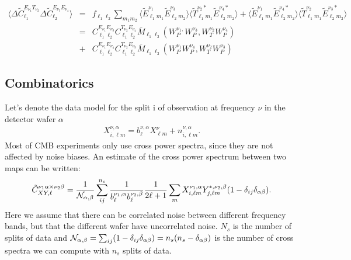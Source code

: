 \documentclass[a4paper, 11pt]{article}
\def\ba{\begin{eqnarray}}
\def\ea{\end{eqnarray}}
\begin{document}
\ba
\langle \Delta \tilde{C}^{E_{\nu_{1}}T_{\nu_{2}}}_{\ell_{1}} \Delta  \tilde{C}^{E_{\nu_{3}}E_{\nu_{4}}}_{\ell_{2}}\rangle &=& f_{\ell_{1} \ell_{2}} \sum_{m_{1} m_{2}} \langle  \tilde{E}^{\nu_{1}}_{ \ell_{1} m_{1}} \tilde{E}^{\nu_{3}}_{ \ell_{2} m_{2}}\rangle \langle \tilde{T}^{\nu_{2} *}_{ \ell_{1} m_{1}} \tilde{E}^{\nu_{4} *}_{  \ell_{2} m_{2}}\rangle + \langle \tilde{E}^{\nu_{1}}_{ \ell_{1} m_{1}} \tilde{E}^{\nu_{4} *}_{  \ell_{2} m_{2}}\rangle \langle \tilde{T}^{\nu_{2}}_{ \ell_{1} m_{1}} \tilde{E}^{\nu_{3} *}_{  \ell_{2} m_{2}}\rangle \nonumber \\
&=&     C^{E_{\nu_{1}}E_{\nu_{3}}}_{\ell_{1}\ell_{2}}  C^{T_{\nu_{2}}E_{\nu_{4}}}_{\ell_{1}\ell_{2}}  \bar{M}_{\ell_{1} \ell_{2}}(W_{P}^{\nu_{1}, } W_{P}^{\nu_{3}},W_{T}^{ \nu_{2} }W_{P}^{ \nu_{4} }) \nonumber \\
& +& C^{E_{\nu_{1}}E_{\nu_{4}}}_{\ell_{1}\ell_{2}}  C^{T_{\nu_{2}}E_{\nu_{3}}}_{\ell_{1}\ell_{2}}  \bar{M}_{\ell_{1} \ell_{2}}(W_{P}^{\nu_{1}}W_{P}^{ \nu_{4} },W_{T}^{ \nu_{2} }W_{P}^{\nu_{3}})
\ea

\subsection{Combinatorics}

Let's denote the data model for the split i of observation at frequency $\nu$ in the detector wafer $\alpha$ 
\ba
X^{\nu, \alpha}_{i, \ell m}=  b_{\ell}^{\nu, \alpha} X_{\ell m}^{\nu} + n^{\nu, \alpha}_{i, \ell m} .
\ea
Most of  CMB experiments only use cross power spectra, since they are not affected by noise biases. An estimate of the cross power spectrum between two maps can be written:
\ba
\tilde{C}^{ \nu_{1} \alpha \times \nu_{2} \beta}_{XY, \ell}= \frac{1}{ \cal N_{\alpha, \beta}} \sum^{n_{s}}_{ij} \frac{1}{b_{\ell}^{\nu_{1}, \alpha} b_{\ell}^{\nu_{2}, \beta}}  \frac{1}{2 \ell +1} \sum_{m}  X^{\nu_{1}, \alpha}_{i, \ell m} Y^{*,\nu_{2}, \beta}_{j, \ell m} (1- \delta_{ij}\delta_{\alpha \beta} ).
\ea
Here we assume that there can be correlated noise between different frequency bands, but that the different wafer have uncorrelated noise.
$N_{s}$ is the number of splits of data and  ${\cal N}_{\alpha, \beta}=  \sum_{ij} (1- \delta_{ij}\delta_{\alpha \beta} ) = n_{s}(n_{s} -\delta_{\alpha \beta})$ is the number of cross spectra we can compute with $n_{s}$  splits of data.
\end{document}
